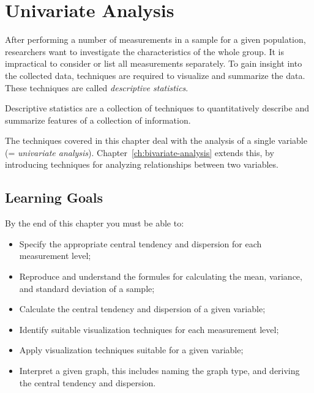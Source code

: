 \chapter{Univariate Analysis}
\label{ch:univariate-analysis}

After performing a number of measurements in a sample for a given population, researchers want to investigate the characteristics of the whole group. It is impractical to consider or list all measurements separately. To gain insight into the collected data, techniques are required to visualize and summarize the data. These techniques are called \emph{descriptive statistics}.


\begin{definition}
  Descriptive statistics are a collection of techniques to quantitatively describe and summarize features of a collection of information.
\end{definition}

The techniques covered in this chapter deal with the analysis of a single variable (= \emph{univariate analysis}). Chapter~\ref{ch:bivariate-analysis} extends this, by introducing techniques for analyzing relationships between two variables.

\section{Learning Goals}
\label{sec:analyse1var-leerdoelen}

By the end of this chapter you must be able to:

\begin{itemize}
    \item Specify the appropriate central tendency and dispersion for each measurement level;
    \item Reproduce and understand the formules for calculating the mean, variance, and standard deviation of a sample;
    \item Calculate the central tendency and dispersion of a given variable;
    \item Identify suitable visualization techniques for each measurement level;
    \item Apply visualization techniques suitable for a given variable;
    \item Interpret a given graph, this includes naming the graph type, and deriving the central tendency and dispersion.
\end{itemize}

